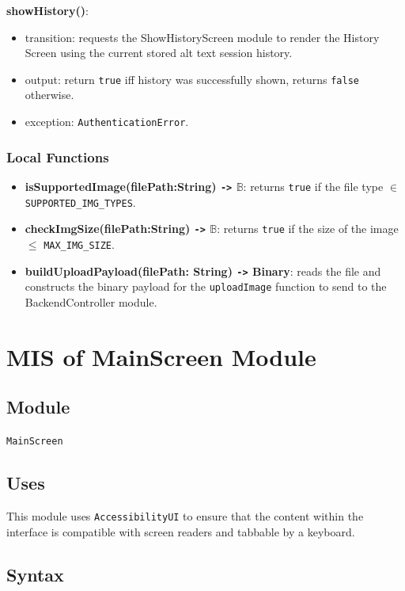 \documentclass[12pt, titlepage]{article}
\newcommand{\Bool}{\ensuremath{\mathbb{B}}}
\begin{document}
\noindent \textbf{showHistory()}:
\begin{itemize}
  \item transition: requests the ShowHistoryScreen module to render
    the History Screen using the current stored alt text session history.
  \item output: return \texttt{true} iff history was successfully
    shown, returns \texttt{false} otherwise.
  \item exception: \texttt{AuthenticationError}.
\end{itemize}

\subsubsection{Local Functions}

\begin{itemize}
  \item \textbf{isSupportedImage(filePath:String) \texttt{->} \Bool}:
    returns \texttt{true} if
    the file type $\in$ \texttt{SUPPORTED\_IMG\_TYPES}.
  \item \textbf{checkImgSize(filePath:String) \texttt{->} \Bool}:
    returns \texttt{true} if
    the size of the image $\le$ \texttt{MAX\_IMG\_SIZE}.
  \item \textbf{buildUploadPayload(filePath: String) \texttt{->}
    Binary}: reads the file and constructs the binary payload for the
    \texttt{uploadImage} function to send to the BackendController module.
\end{itemize}

\section{MIS of MainScreen Module}\label{MainScreen}

\subsection{Module}

\texttt{MainScreen}

\subsection{Uses}
This module uses \texttt{AccessibilityUI} to ensure that the content
within the interface is
compatible with screen readers and tabbable by a keyboard.

\subsection{Syntax}
\end{document}
